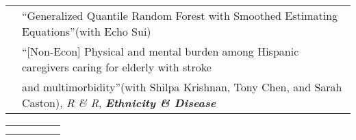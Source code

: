 \documentclass[10pt]{article}
\begin{document}
\begin{center}
\begin{tabular}{llllr}
& \multicolumn{4}{l}{\textquotedblleft Generalized Quantile Random Forest with Smoothed Estimating Equations\textquotedblright (with Echo Sui)} \\
& \multicolumn{4}{l}{\textquotedblleft [Non-Econ]\,\,Physical and mental burden among Hispanic caregivers caring for elderly with stroke }\\
& \multicolumn{4}{l}{and multimorbidity\textquotedblright  (with Shilpa Krishnan, Tony Chen, and Sarah Caston), \emph{R \& R}, {\bf\emph {Ethnicity \& Disease}}} \\
\end{tabular}

\clearpage

\begin{tabular}{ccccc}
\hline
\multicolumn{5}{p{460pt}}{}\\\\
\end{tabular}


\end{center}
\end{document}
